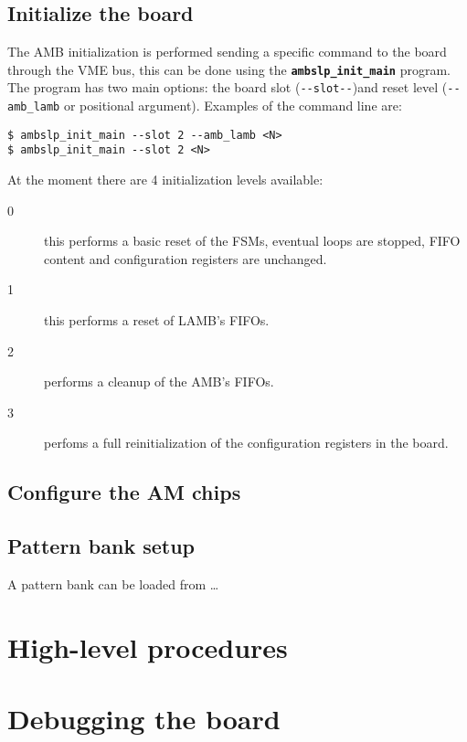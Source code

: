 \documentclass[UKenglish]{latex/atlasdoc}
\begin{document}
\subsection{Initialize the board}
\label{sec:ambslpinit}

The AMB initialization is performed sending a specific command
to the board through the VME bus, this can be done using the 
\textbf{\texttt{ambslp\_init\_main}} program. The program has two
main options: the board slot (\verb|--slot--|)and reset level (\verb|--amb_lamb| 
or positional argument).
Examples of the command line are:
\begin{verbatim}
$ ambslp_init_main --slot 2 --amb_lamb <N>
$ ambslp_init_main --slot 2 <N>
\end{verbatim}

At the moment there are 4 initialization levels available:
\begin{description}
	\item[0] this performs a basic reset of the FSMs, eventual loops
	are stopped, FIFO content and configuration registers are unchanged.
	
	\item[1] this performs a reset of LAMB's FIFOs.
	
	\item[2] performs a cleanup of the AMB's FIFOs.
	
	\item[3] perfoms a full reinitialization of the configuration registers
	in the board.
\end{description}


\subsection{Configure the AM chips}



\subsection{Pattern bank setup}
\label{sec:bankload}

A pattern bank can be loaded from \ldots

\section{High-level procedures}
\label{sec:highlevel}



\section{Debugging the board}
\end{document}
